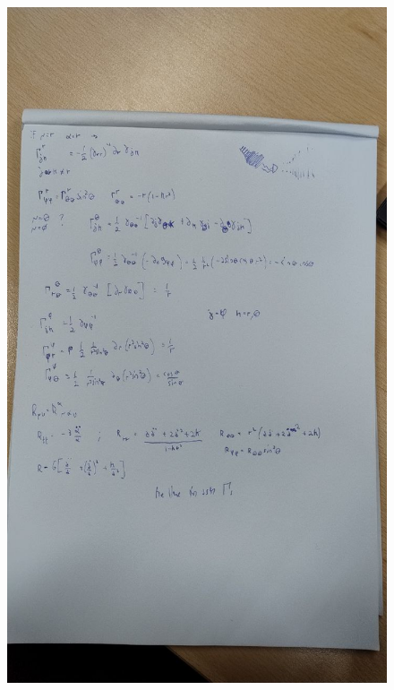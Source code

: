 \begin{figure}[h]
\centering
\includegraphics[width=\linewidth]{imm/lec23_2_3.jpg}
\caption{}
\label{imm:lec23_2_3.jpg}
\end{figure}













